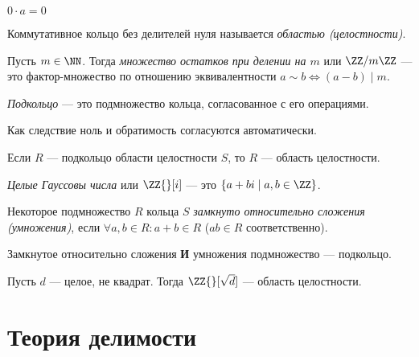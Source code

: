 \documentclass[12pt,a4paper]{article}
\begin{document}
    \begin{lemma}
        $0 \cdot a = 0$
    \end{lemma}

    \begin{definition}
        Коммутативное кольцо без делителей нуля называется \emph{областью (целостности)}.
    \end{definition}

    \begin{definition}
        Пусть $m\in\NN$. Тогда \emph{множество остатков при делении на $m$} или $\ZZ/m\ZZ$ --- это фактор-множество по отношению эквивалентности $a\sim b \Leftrightarrow (a-b) \mid m$.
    \end{definition}

    \begin{definition}
        \emph{Подкольцо} --- это подмножество кольца, согласованное с его операциями.

        Как следствие ноль и обратимость согласуются автоматически.
    \end{definition}

    \begin{statement}
        Если $R$ --- подкольцо области целостности $S$, то $R$ --- область целостности.
    \end{statement}

    \begin{definition}
        \emph{Целые Гауссовы числа} или $\ZZ{}[i]$ --- это $\{a + bi \mid a, b \in \ZZ\}$.
    \end{definition}

    \begin{definition}
        Некоторое подмножество $R$ кольца $S$ \emph{замкнуто относительно сложения (умножения)}, если $\forall a, b \in R: a + b \in R$ ($ab \in R$ соответственно).
    \end{definition}

    \begin{remark}
        Замкнутое относительно сложения \textbf{И} умножения подмножество --- подкольцо.
    \end{remark}

    \begin{example}
        Пусть $d$ --- целое, не квадрат. Тогда $\ZZ{}[\sqrt{d}]$ --- область целостности.
    \end{example}

    \section{Теория делимости}
\end{document}
